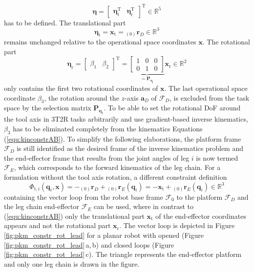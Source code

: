 \documentclass[robotics,article,accept,moreauthors,pdftex]{Definitions/mdpi}
\newcommand{\bm}[1]{\boldsymbol{#1}}
\newcommand{\ortvek}[4]{{ }_{(#1)}{\boldsymbol{#2}}^{#3}_{#4} }
\newcommand{\transp}[0]{{\mathrm{T}}}
\newcommand{\ks}[1]{{\mathcal{F}}_{#1}}
\let\Phi\varPhi
\begin{document}
\begin{equation}
\bm{\eta}
=
\begin{bmatrix}
\bm{\eta}_{\mathrm{t}}^\transp & 
\bm{\eta}_{\mathrm{r}}^\transp
\end{bmatrix}^\transp
\in {\mathbb{R}}^{5}
\end{equation}
%
has to be defined.
%
The translational part
%
\begin{equation}
\bm{\eta}_{\mathrm{t}}
=
\bm{x}_{\mathrm{t}}
=
\ortvek{0}{r}{}{D}
\in {\mathbb{R}}^{3}
\end{equation}
%
remains unchanged relative to the operational space coordinates $\bm{x}$.
The rotational part
%
\begin{equation}
\bm{\eta}_{\mathrm{r}}
=
\begin{bmatrix}
\beta_1 & \beta_2
\end{bmatrix}^\transp
=
\underbrace{\begin{bmatrix}
    1 & 0 & 0 \\ 
    0 & 1 & 0 \end{bmatrix}}_{=\bm{P}_{\bm{\eta}_\mathrm{r}}}
\bm{x}_{\mathrm{r}}
\in {\mathbb{R}}^{2}
\label{equ:etar_def}
\end{equation}
%
only contains the first two rotational coordinates of $\bm{x}$.
The last operational space coordinate $\beta_3$, the rotation around the $z$-axis $\bm{a}_{D}$ of $\ks{D}$, is excluded from the task space by the selection matrix $\bm{P}_{\bm{\eta}_\mathrm{r}}$.
To be able to set the rotational DoF around the tool axis in 3T2R tasks arbitrarily and use gradient-based inverse kinematics, $\beta_3$ has to be eliminated completely from the kinematics Equations (\ref{equ:kinconstrAB}).
%
%
To simplify the following elaborations, the platform frame $\ks{D}$ is still identified as the desired frame of the inverse kinematics problem and the end-effector frame that results from the joint angles of leg $i$ is now termed $\ks{E}$, which corresponds to the forward kinematics of the leg chain.
%
For a formulation without the tool axis rotation, a different constraint definition
%
\begin{equation}
\bm{\Phi}_{\mathrm{t},i}(\bm{q}_i,\bm{x})
= 
- \ortvek{0}{r}{}{D} + \ortvek{0}{r}{}{E}(\bm{q}_i)
=
- \bm{x}_{\mathrm{t}} + \ortvek{0}{r}{}{E}(\bm{q}_i) \in {\mathbb{R}}^{3}
\label{equ:Phit_def_i}
\end{equation}
%
containing the vector loop from the robot base frame $\ks{0}$ to the platform $\ks{D}$ and the leg chain end-effector $\ks{E}$ can be used, where in contrast to (\ref{equ:kinconstrAB}) only the translational part $\bm{x}_{\mathrm{t}}$ of the end-effector coordinates appears and not the rotational part $\bm{x}_{\mathrm{r}}$.
The vector loop is depicted in Figure\,\ref{fig:pkm_constr_rot_lead} for a planar robot with opened (Figure\,\ref{fig:pkm_constr_rot_lead}\,a,\,b) and closed loops (Figure\,\ref{fig:pkm_constr_rot_lead}\,c).
The triangle represents the end-effector platform and only one leg chain is drawn in the figure.
\end{document}
